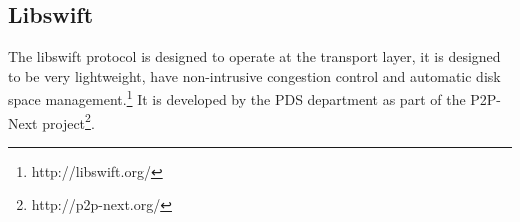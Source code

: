 \subsection{Libswift}
The libswift protocol is designed to operate at the transport layer, it is designed to be very lightweight, have non-intrusive congestion control and automatic disk space management.\footnote{http://libswift.org/} It is developed by the PDS department as part of the P2P-Next project\footnote{http://p2p-next.org/}.